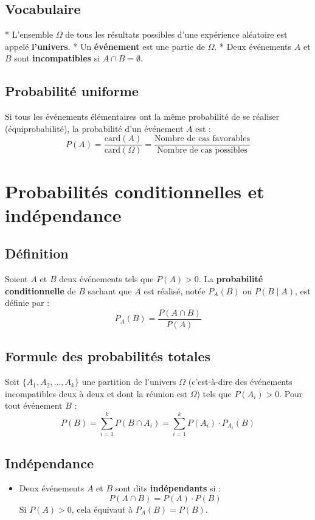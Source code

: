 \documentclass{article}
\begin{document}
	\subsection{Vocabulaire}
	* L'ensemble $\Omega$ de tous les résultats possibles d'une expérience aléatoire est appelé \textbf{l'univers}.
	* Un \textbf{événement} est une partie de $\Omega$.
	* Deux événements $A$ et $B$ sont \textbf{incompatibles} si $A \cap B = \emptyset$.
	
	\subsection{Probabilité uniforme}
	Si tous les événements élémentaires ont la même probabilité de se réaliser (équiprobabilité), la probabilité d'un événement $A$ est :
	\[ P(A) = \frac{\text{card}(A)}{\text{card}(\Omega)} = \frac{\text{Nombre de cas favorables}}{\text{Nombre de cas possibles}} \]
	
	\section{Probabilités conditionnelles et indépendance}
	
	\subsection{Définition}
	Soient $A$ et $B$ deux événements tels que $P(A) > 0$.
	La \textbf{probabilité conditionnelle} de $B$ sachant que $A$ est réalisé, notée $P_A(B)$ ou $P(B \mid A)$, est définie par :
	\[ P_A(B) = \frac{P(A \cap B)}{P(A)} \]
	
	\subsection{Formule des probabilités totales}
	Soit $\{A_1, A_2, \dots, A_k\}$ une partition de l'univers $\Omega$ (c'est-à-dire des événements incompatibles deux à deux et dont la réunion est $\Omega$) tels que $P(A_i) > 0$. Pour tout événement $B$ :
	\[ P(B) = \sum_{i=1}^k P(B \cap A_i) = \sum_{i=1}^k P(A_i) \cdot P_{A_i}(B) \]
	
	\subsection{Indépendance}
	\begin{itemize}
		\item Deux événements $A$ et $B$ sont dits \textbf{indépendants} si :
		\[ P(A \cap B) = P(A) \cdot P(B) \]
		Si $P(A) > 0$, cela équivaut à $P_A(B) = P(B)$.
	\end{itemize}
	
\end{document}
